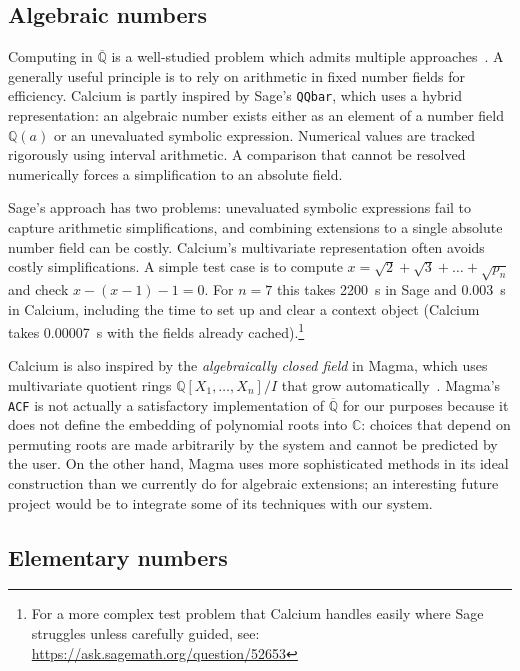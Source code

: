 \documentclass[11pt,a4paper]{article}
\begin{document}
\subsection{Algebraic numbers}

Computing in $\overline{\mathbb{Q}}$ is a well-studied problem
which admits multiple approaches~\cite{Coh1996,Yu2010}.
A generally useful principle is to rely on arithmetic
in fixed number fields for efficiency.
Calcium is partly inspired by
Sage's \texttt{QQbar}, which uses a hybrid representation:
an algebraic number exists either as an
element of a number field $\mathbb{Q}(a)$ or
an unevaluated symbolic expression.
Numerical values are tracked rigorously using interval arithmetic.
A comparison that cannot be resolved numerically
forces a simplification to an absolute field.

Sage's approach has two problems: unevaluated symbolic
expressions fail to capture arithmetic simplifications,
and combining extensions to a single
absolute number field can be costly.
Calcium's multivariate representation often avoids
costly simplifications.
A simple test case is to compute $x = \sqrt{2} + \sqrt{3} + \ldots + \sqrt{p_n}$
and check $x-(x-1)-1 = 0$.
For $n = 7$ this takes 2200~s in Sage and 0.003~s in Calcium, including the
time to set up and clear a context object (Calcium takes 0.00007~s with the fields already cached).\footnote{For a more complex test problem that Calcium handles easily
where Sage struggles unless carefully guided, see: \url{https://ask.sagemath.org/question/52653}}

Calcium is also inspired by the \emph{algebraically closed field}
in Magma,
which uses multivariate quotient rings
$\mathbb{Q}[X_1,\ldots,X_n] / I$
that grow automatically~\cite{Ste2002,Ste2010}.
Magma's \texttt{ACF} is not actually a satisfactory implementation of $\overline{\mathbb{Q}}$
for our purposes
because it does not define the embedding of polynomial roots into $\mathbb{C}$:
choices that depend on permuting roots are made arbitrarily by the system
and cannot be predicted by the user.
On the other hand, Magma uses more sophisticated methods
in its ideal construction than we currently do for algebraic extensions; an interesting
future project would be to integrate some of its techniques with our system.

\subsection{Elementary numbers}
\end{document}
